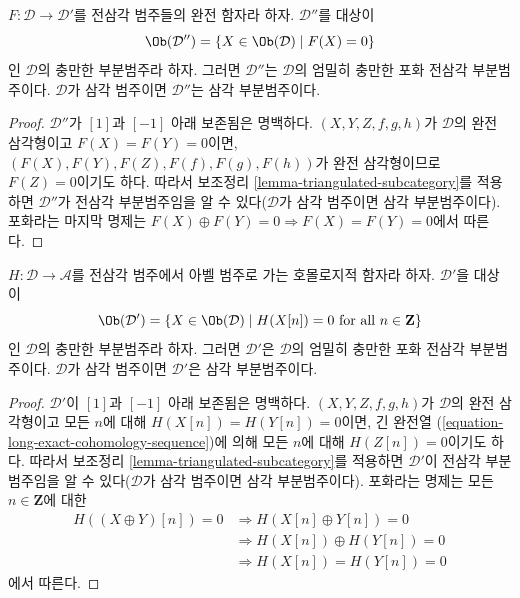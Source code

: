 \begin{lemma}
\label{lemma-triangle-functor-kernel}
$F : \mathcal{D} \to \mathcal{D}'$를 전삼각 범주들의 완전 함자라 하자.
$\mathcal{D}''$를 대상이
$$
\Ob(\mathcal{D}'') =
\{X \in \Ob(\mathcal{D}) \mid F(X) = 0\}
$$
인 $\mathcal{D}$의 충만한 부분범주라 하자. 그러면
$\mathcal{D}''$는 $\mathcal{D}$의 엄밀히 충만한 포화 전삼각
부분범주이다. $\mathcal{D}$가 삼각 범주이면 $\mathcal{D}''$는
삼각 부분범주이다.
\end{lemma}

\begin{proof}
$\mathcal{D}''$가 $[1]$과 $[-1]$ 아래 보존됨은 명백하다.
$(X, Y, Z, f, g, h)$가 $\mathcal{D}$의 완전 삼각형이고
$F(X) = F(Y) = 0$이면,
$(F(X), F(Y), F(Z), F(f), F(g), F(h))$가 완전 삼각형이므로
$F(Z) = 0$이기도 하다. 따라서 보조정리
\ref{lemma-triangulated-subcategory}를 적용하면 $\mathcal{D}''$가
전삼각 부분범주임을 알 수 있다($\mathcal{D}$가 삼각 범주이면
삼각 부분범주이다). 포화라는 마지막 명제는
$F(X) \oplus F(Y) = 0 \Rightarrow F(X) = F(Y) = 0$에서 따른다.
\end{proof}

\begin{lemma}
\label{lemma-homological-functor-kernel}
$H : \mathcal{D} \to \mathcal{A}$를 전삼각 범주에서 아벨 범주로 가는
호몰로지적 함자라 하자. $\mathcal{D}'$을 대상이
$$
\Ob(\mathcal{D}') =
\{X \in \Ob(\mathcal{D}) \mid
H(X[n]) = 0\text{ for all }n \in \mathbf{Z}\}
$$
인 $\mathcal{D}$의 충만한 부분범주라 하자. 그러면
$\mathcal{D}'$은 $\mathcal{D}$의 엄밀히 충만한 포화 전삼각
부분범주이다. $\mathcal{D}$가 삼각 범주이면 $\mathcal{D}'$은
삼각 부분범주이다.
\end{lemma}

\begin{proof}
$\mathcal{D}'$이 $[1]$과 $[-1]$ 아래 보존됨은 명백하다.
$(X, Y, Z, f, g, h)$가 $\mathcal{D}$의 완전 삼각형이고 모든 $n$에
대해 $H(X[n]) = H(Y[n]) = 0$이면, 긴 완전열
(\ref{equation-long-exact-cohomology-sequence})에 의해 모든 $n$에 대해
$H(Z[n]) = 0$이기도 하다. 따라서 보조정리
\ref{lemma-triangulated-subcategory}를 적용하면 $\mathcal{D}'$이
전삼각 부분범주임을 알 수 있다($\mathcal{D}$가 삼각 범주이면
삼각 부분범주이다). 포화라는 명제는 모든 $n \in \mathbf{Z}$에 대한
\begin{align*}
H((X \oplus Y)[n]) = 0 & \Rightarrow H(X[n] \oplus Y[n]) = 0 \\
& \Rightarrow H(X[n]) \oplus H(Y[n]) = 0 \\
& \Rightarrow H(X[n]) = H(Y[n]) = 0
\end{align*}
에서 따른다.
\end{proof}

